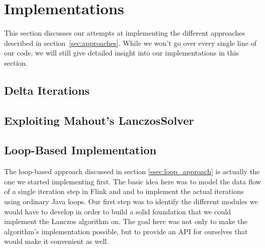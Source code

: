 \section{Implementations}


This section discusses our attempts at implementing the different approaches
described in section~\ref{sec:approaches}. While we won't go over every single
line of our code, we will still give detailed insight into our implementations
in this section.

\subsection{Delta Iterations}

\subsection{Exploiting Mahout's LanczosSolver}



\subsection{Loop-Based Implementation}

The loop-based approach discussed in section \ref{ssec:loop_approach} is
actually the one we started implementing first. The basic idea here was to
model the data flow of a single iteration step in Flink and and to implement
the actual iterations using ordinary Java loops. Our first step was to identify
the different modules we would have to develop in order to build a solid
foundation that we could implement the Lanczos algorithm on. The goal here was
not only to make the algorithm's implementation possible, but to provide an API
for ourselves that would make it convenient as well.


